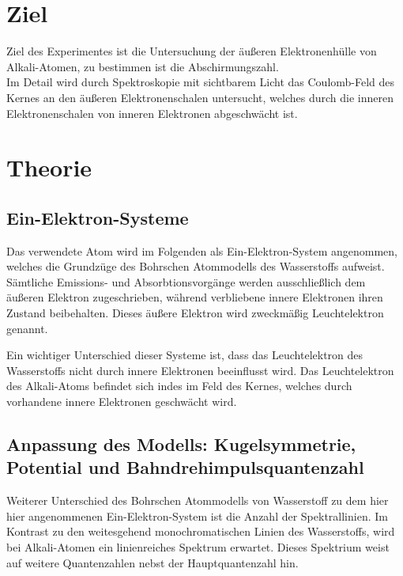 \section*{Ziel}
Ziel des Experimentes ist die Untersuchung der äußeren Elektronenhülle von Alkali-Atomen, zu bestimmen ist die Abschirmungszahl.\\
Im Detail wird durch Spektroskopie mit sichtbarem Licht das Coulomb-Feld des Kernes an den äußeren Elektronenschalen untersucht,
welches durch die inneren Elektronenschalen von inneren Elektronen abgeschwächt ist.

\section{Theorie}
\label{sec:Theorie}
\subsection{Ein-Elektron-Systeme} %
\label{sub:1e}
Das verwendete Atom wird im Folgenden als Ein-Elektron-System angenommen, welches die Grundzüge des Bohrschen Atommodells des Wasserstoffs aufweist.
Sämtliche Emissions- und Absorbtionsvorgänge werden ausschließlich dem äußeren Elektron zugeschrieben, während verbliebene innere Elektronen ihren Zustand beibehalten.
Dieses äußere Elektron wird zweckmäßig Leuchtelektron genannt.

Ein wichtiger Unterschied dieser Systeme ist, dass das Leuchtelektron des Wasserstoffs nicht durch innere Elektronen beeinflusst wird.
Das Leuchtelektron des Alkali-Atoms befindet sich indes im Feld des Kernes, welches durch vorhandene innere Elektronen geschwächt wird.

\subsection{Anpassung des Modells: Kugelsymmetrie, Potential und Bahndrehimpulsquantenzahl} %
\label{sub:L_quantenzahl}
Weiterer Unterschied des Bohrschen Atommodells von Wasserstoff zu dem hier hier angenommenen Ein-Elektron-System ist die Anzahl der Spektrallinien. 
Im Kontrast zu den weitesgehend monochromatischen Linien des Wasserstoffs, wird bei Alkali-Atomen ein linienreiches Spektrum erwartet.
Dieses Spektrium weist auf weitere Quantenzahlen nebst der Hauptquantenzahl hin.

